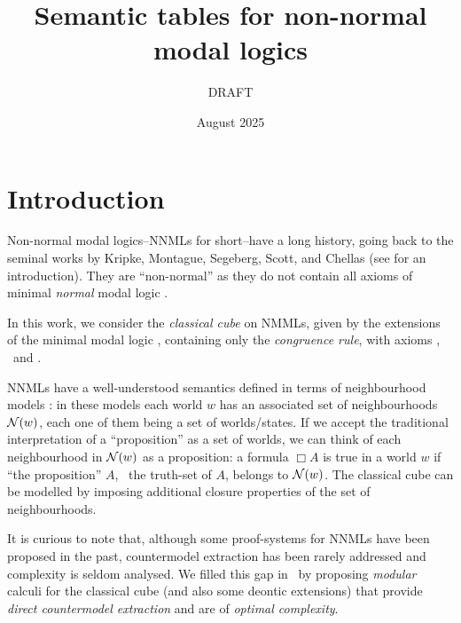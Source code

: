 \documentclass{llncs}
\title{Semantic tables for non-normal modal logics}
\author{DRAFT}
\date{August 2025}
\begin{document}
\maketitle

\section{Introduction}
Non-normal modal logics--NNMLs for short--have a long history, going back to the seminal works by Kripke, Montague, Segeberg, Scott, and Chellas (see 
\cite{Chellas:1980fk} for an introduction). They are ``non-normal'' as they do not contain all axioms of minimal \emph{normal} modal logic  \K. 

In this work, we consider  the {\em classical cube} on NMMLs, given by the extensions of the  minimal modal logic \E, containing only the {\em congruence rule}, 
with axioms \axC, \axM\ and \axN.


NNMLs have a well-understood semantics defined in terms of
neighbourhood models \cite{Pacuit:2017}: in these models  each world $w$ has an
associated set of neighbourhoods $\mathcal N(w)$, each one of them being a set
of worlds/states.  If we accept the traditional interpretation of a ``proposition'' as a set of worlds, we can think of  each neighbourhood  in $\mathcal N(w)$ as a proposition: a formula
$\Box A$ is true in a world $w$ if ``the proposition'' $A$, \ie\ the truth-set of $A$, belongs to
$\mathcal N(w)$.  The classical cube can be modelled by imposing additional closure properties of the set of neighbourhoods.  


It is curious to note that, although some proof-systems for NNMLs have been proposed in the past, countermodel extraction has been rarely addressed and complexity is seldom analysed. We filled this gap in~\cite{DBLP:journals/logcom/DalmonteLOP21} by
proposing \emph{modular} 
calculi for the classical cube (and also some deontic extensions)  that provide  {\em direct countermodel extraction} 
and are of {\em optimal complexity}.  
\end{document}
